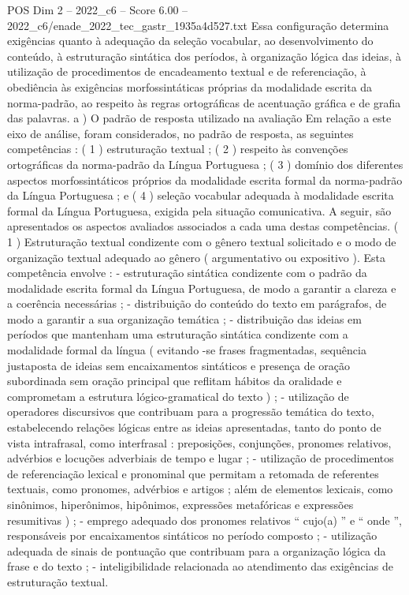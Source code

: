 \begin{textsample}{POS Dim 2 – 2022\_c6 – Score 6.00 – 2022\_c6/enade\_2022\_tec\_gastr\_1935a4d527.txt}
Essa configuração determina exigências quanto à adequação da seleção vocabular, ao desenvolvimento do conteúdo, à estruturação sintática dos períodos, à organização lógica das ideias, à utilização de procedimentos de encadeamento textual e de referenciação, à obediência às exigências morfossintáticas próprias da modalidade escrita da norma-padrão, ao respeito às regras ortográficas de acentuação gráfica e de grafia das palavras. a ) O padrão de resposta utilizado na avaliação Em relação a este eixo de análise, foram considerados, no padrão de resposta, as seguintes competências : ( 1 ) estruturação textual ; ( 2 ) respeito às convenções ortográficas da norma-padrão da Língua Portuguesa ; ( 3 ) domínio dos diferentes aspectos morfossintáticos próprios da modalidade escrita formal da norma-padrão da Língua Portuguesa ; e ( 4 ) seleção vocabular adequada à modalidade escrita formal da Língua Portuguesa, exigida pela situação comunicativa.
A seguir, são apresentados os aspectos avaliados associados a cada uma destas competências. ( 1 ) Estruturação textual condizente com o gênero textual solicitado e o modo de organização textual adequado ao gênero ( argumentativo ou expositivo ).
Esta competência envolve : - estruturação sintática condizente com o padrão da modalidade escrita formal da Língua Portuguesa, de modo a garantir a clareza e a coerência necessárias ; - distribuição do conteúdo do texto em parágrafos, de modo a garantir a sua organização temática ; - distribuição das ideias em períodos que mantenham uma estruturação sintática condizente com a modalidade formal da língua ( evitando -se frases fragmentadas, sequência justaposta de ideias sem encaixamentos sintáticos e presença de oração subordinada sem oração principal que reflitam hábitos da oralidade e comprometam a estrutura lógico-gramatical do texto ) ; - utilização de operadores discursivos que contribuam para a progressão temática do texto, estabelecendo relações lógicas entre as ideias apresentadas, tanto do ponto de vista intrafrasal, como interfrasal : preposições, conjunções, pronomes relativos, advérbios e locuções adverbiais de tempo e lugar ; - utilização de procedimentos de referenciação lexical e pronominal que permitam a retomada de referentes textuais, como pronomes, advérbios e artigos ; além de elementos lexicais, como sinônimos, hiperônimos, hipônimos, expressões metafóricas e expressões resumitivas ) ; - emprego adequado dos pronomes relativos “ cujo(a) ” e “ onde ”, responsáveis por encaixamentos sintáticos no período composto ; - utilização adequada de sinais de pontuação que contribuam para a organização lógica da frase e do texto ; - inteligibilidade relacionada ao atendimento das exigências de estruturação textual.

\end{textsample}
